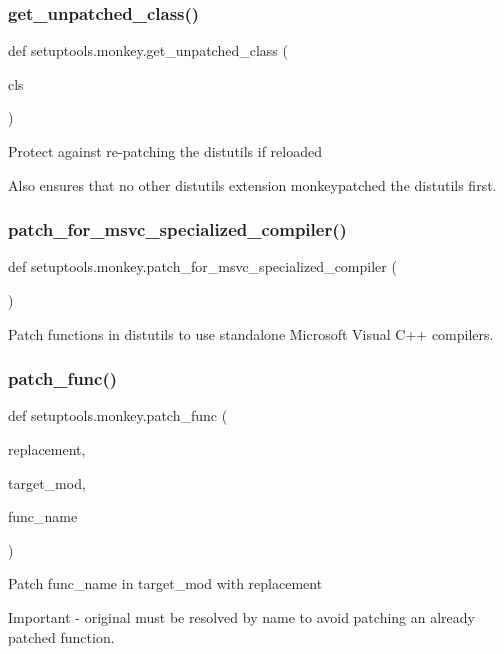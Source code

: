 \subsubsection{\texorpdfstring{get\+\_\+unpatched\+\_\+class()}{get\_unpatched\_class()}}
{\footnotesize\ttfamily def setuptools.\+monkey.\+get\+\_\+unpatched\+\_\+class (\begin{DoxyParamCaption}\item[{}]{cls }\end{DoxyParamCaption})}

\begin{DoxyVerb}Protect against re-patching the distutils if reloaded

Also ensures that no other distutils extension monkeypatched the distutils
first.
\end{DoxyVerb}
 \mbox{\label{namespacesetuptools_1_1monkey_a496bc1769e481213444b1d53185b1b89}} 
\subsubsection{\texorpdfstring{patch\+\_\+for\+\_\+msvc\+\_\+specialized\+\_\+compiler()}{patch\_for\_msvc\_specialized\_compiler()}}
{\footnotesize\ttfamily def setuptools.\+monkey.\+patch\+\_\+for\+\_\+msvc\+\_\+specialized\+\_\+compiler (\begin{DoxyParamCaption}{ }\end{DoxyParamCaption})}

\begin{DoxyVerb}Patch functions in distutils to use standalone Microsoft Visual C++
compilers.
\end{DoxyVerb}
 \mbox{\label{namespacesetuptools_1_1monkey_ac6c1bb45a1d90ebcaf099ada0682616b}} 
\subsubsection{\texorpdfstring{patch\+\_\+func()}{patch\_func()}}
{\footnotesize\ttfamily def setuptools.\+monkey.\+patch\+\_\+func (\begin{DoxyParamCaption}\item[{}]{replacement,  }\item[{}]{target\+\_\+mod,  }\item[{}]{func\+\_\+name }\end{DoxyParamCaption})}

\begin{DoxyVerb}Patch func_name in target_mod with replacement

Important - original must be resolved by name to avoid
patching an already patched function.
\end{DoxyVerb}
 